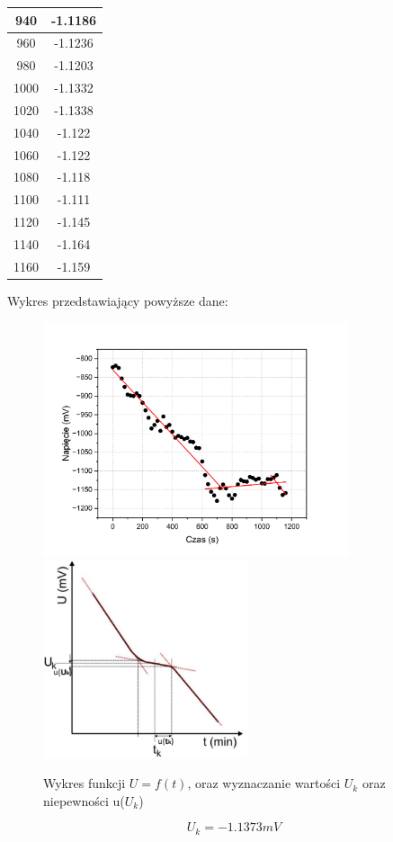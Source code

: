 \begin{multicols}{3}
\begin{center}
\begin{tabular}{|c|c|}
            940          & -1.1186          \\ \hline
            960          & -1.1236          \\ \hline
            980          & -1.1203          \\ \hline
            1000         & -1.1332          \\ \hline
            1020         & -1.1338          \\ \hline
            1040         & -1.122           \\ \hline
            1060         & -1.122           \\ \hline
            1080         & -1.118           \\ \hline
            1100         & -1.111           \\ \hline
            1120         & -1.145           \\ \hline
            1140         & -1.164           \\ \hline
            1160         & -1.159           \\ \hline
        \end{tabular}
    \end{center}
\end{multicols} \vspace{3mm}

Wykres przedstawiający powyższe dane:
\begin{figure}[!ht]
    \centering
    \includegraphics[width = 9cm]{imgs/Graph5.png}
    \includegraphics[width = 6cm]{imgs/graph4.png}
    \caption{Wykres funkcji $U = f(t)$, oraz wyznaczanie wartości $U_k$ oraz niepewności u($U_k$)}
    \label{fig:wykres-krzepniecie}
\end{figure}
$$ U_k=-1.1373mV $$

